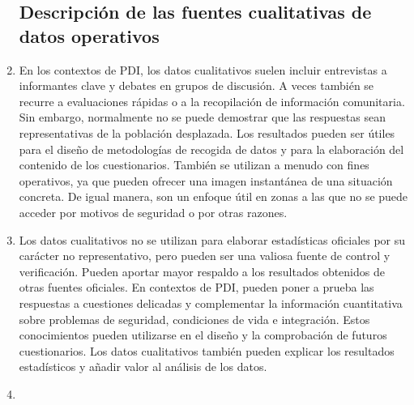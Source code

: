 \documentclass[
]{book}
\begin{document}
\begin{enumerate}
{  \subsection{Descripción de las fuentes cualitativas de datos operativos}\label{descripciuxf3n-de-las-fuentes-cualitativas-de-datos-operativos}}
\item
  En los contextos de PDI, los datos cualitativos suelen incluir entrevistas a informantes clave y debates en grupos de discusión. A veces también se recurre a evaluaciones rápidas o a la recopilación de información comunitaria. Sin embargo, normalmente no se puede demostrar que las respuestas sean representativas de la población desplazada. Los resultados pueden ser útiles para el diseño de metodologías de recogida de datos y para la elaboración del contenido de los cuestionarios. También se utilizan a menudo con fines operativos, ya que pueden ofrecer una imagen instantánea de una situación concreta. De igual manera, son un enfoque útil en zonas a las que no se puede acceder por motivos de seguridad o por otras razones.
\item
  Los datos cualitativos no se utilizan para elaborar estadísticas oficiales por su carácter no representativo, pero pueden ser una valiosa fuente de control y verificación. Pueden aportar mayor respaldo a los resultados obtenidos de otras fuentes oficiales. En contextos de PDI, pueden poner a prueba las respuestas a cuestiones delicadas y complementar la información cuantitativa sobre problemas de seguridad, condiciones de vida e integración. Estos conocimientos pueden utilizarse en el diseño y la comprobación de futuros cuestionarios. Los datos cualitativos también pueden explicar los resultados estadísticos y añadir valor al análisis de los datos.
\item ~
  \hypertarget{consideraciones-sobre-la-calidad-de-los-datos-operativos}{%
}
\end{enumerate}
\end{document}

